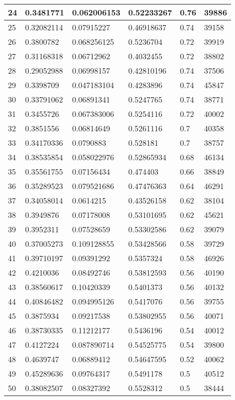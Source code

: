 \begin{longtable}{|l|l|l|l|l|l|}
24 & 0.3481771 & 0.062006153 & 0.52233267 & 0.76 & 39886 \\ \hline 
25 & 0.32082114 & 0.07915227 & 0.46918637 & 0.74 & 39158 \\ \hline 
26 & 0.3800782 & 0.068256125 & 0.5236704 & 0.72 & 39919 \\ \hline 
27 & 0.31168318 & 0.06712962 & 0.4032455 & 0.72 & 38802 \\ \hline 
28 & 0.29052988 & 0.06998157 & 0.42810196 & 0.74 & 37506 \\ \hline 
29 & 0.3398709 & 0.047183104 & 0.4283896 & 0.74 & 45847 \\ \hline 
30 & 0.33791062 & 0.06891341 & 0.5247765 & 0.74 & 38771 \\ \hline 
31 & 0.3455726 & 0.067383006 & 0.5254116 & 0.72 & 40002 \\ \hline 
32 & 0.3851556 & 0.06814649 & 0.5261116 & 0.7 & 40358 \\ \hline 
33 & 0.34170336 & 0.0790883 & 0.528181 & 0.7 & 38757 \\ \hline 
34 & 0.38535854 & 0.058022976 & 0.52865934 & 0.68 & 46134 \\ \hline 
35 & 0.35561755 & 0.07156434 & 0.474403 & 0.66 & 38849 \\ \hline 
36 & 0.35289523 & 0.079521686 & 0.47476363 & 0.64 & 46291 \\ \hline 
37 & 0.34058014 & 0.0614215 & 0.43526158 & 0.62 & 38104 \\ \hline 
38 & 0.3949876 & 0.07178008 & 0.53101695 & 0.62 & 45621 \\ \hline 
39 & 0.3952311 & 0.07528659 & 0.53302586 & 0.62 & 39079 \\ \hline 
40 & 0.37005273 & 0.109128855 & 0.53428566 & 0.58 & 39729 \\ \hline 
41 & 0.39710197 & 0.09391292 & 0.5357324 & 0.58 & 46926 \\ \hline 
42 & 0.4210036 & 0.08492746 & 0.53812593 & 0.56 & 40190 \\ \hline 
43 & 0.38560617 & 0.10420339 & 0.5401373 & 0.56 & 40132 \\ \hline 
44 & 0.40846482 & 0.094995126 & 0.5417076 & 0.56 & 39755 \\ \hline 
45 & 0.3875934 & 0.09217538 & 0.53802955 & 0.56 & 40071 \\ \hline 
46 & 0.38730335 & 0.11212177 & 0.5436196 & 0.54 & 40012 \\ \hline 
47 & 0.4127224 & 0.087890714 & 0.54525775 & 0.54 & 39800 \\ \hline 
48 & 0.4639747 & 0.06889412 & 0.54647595 & 0.52 & 40062 \\ \hline 
49 & 0.45289636 & 0.09764317 & 0.5491178 & 0.5 & 40512 \\ \hline 
50 & 0.38082507 & 0.08327392 & 0.5528312 & 0.5 & 38444 \\ \hline 
\end{longtable}